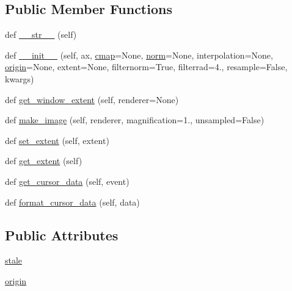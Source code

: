 \subsection*{Public Member Functions}
\begin{DoxyCompactItemize}
\item 
def \hyperlink{classmatplotlib_1_1image_1_1AxesImage_a7e66b306be8784f81616733543df7a42}{\+\_\+\+\_\+str\+\_\+\+\_\+} (self)
\item 
def \hyperlink{classmatplotlib_1_1image_1_1AxesImage_ac756938f67fd63492f2260aa808ea62f}{\+\_\+\+\_\+init\+\_\+\+\_\+} (self, ax, \hyperlink{classmatplotlib_1_1cm_1_1ScalarMappable_a3684ebc12a81cc6f2599c0babd1d40af}{cmap}=None, \hyperlink{classmatplotlib_1_1cm_1_1ScalarMappable_a5507985e8c38feaa3d6972f75db09f73}{norm}=None, interpolation=None, \hyperlink{classmatplotlib_1_1image_1_1AxesImage_a5f5dac751a5431dcd62fb896728e0b64}{origin}=None, extent=None, filternorm=True, filterrad=4., resample=False, kwargs)
\item 
def \hyperlink{classmatplotlib_1_1image_1_1AxesImage_a8c30519cf18fffe127f830310c9aa685}{get\+\_\+window\+\_\+extent} (self, renderer=None)
\item 
def \hyperlink{classmatplotlib_1_1image_1_1AxesImage_a5e60e7f383a19221dcf56e47bf8ab1d4}{make\+\_\+image} (self, renderer, magnification=1., unsampled=False)
\item 
def \hyperlink{classmatplotlib_1_1image_1_1AxesImage_a83b67f22c5065c58b96e2d3866ddab57}{set\+\_\+extent} (self, extent)
\item 
def \hyperlink{classmatplotlib_1_1image_1_1AxesImage_a3ea8bf235d707c8cb759dc1ebac3cb78}{get\+\_\+extent} (self)
\item 
def \hyperlink{classmatplotlib_1_1image_1_1AxesImage_a3b1ea95e189d4a9c4f864c886be03333}{get\+\_\+cursor\+\_\+data} (self, event)
\item 
def \hyperlink{classmatplotlib_1_1image_1_1AxesImage_a98d5f1acc846041718fcc995b56485c9}{format\+\_\+cursor\+\_\+data} (self, data)
\end{DoxyCompactItemize}
\subsection*{Public Attributes}
\begin{DoxyCompactItemize}
\item 
\hyperlink{classmatplotlib_1_1image_1_1AxesImage_a882587d5cf3345c199857ff9605fa02c}{stale}
\item 
\hyperlink{classmatplotlib_1_1image_1_1AxesImage_a5f5dac751a5431dcd62fb896728e0b64}{origin}
\end{DoxyCompactItemize}
